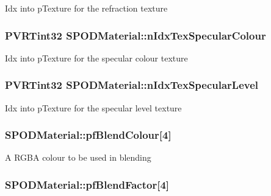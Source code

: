 Idx into p\+Texture for the refraction texture \hypertarget{struct_s_p_o_d_material_acc051ad745e461cbf67d5191cf4500c8}{
\subsubsection[{n\+Idx\+Tex\+Specular\+Colour}]{\setlength{\rightskip}{0pt plus 5cm}P\+V\+R\+Tint32 S\+P\+O\+D\+Material\+::n\+Idx\+Tex\+Specular\+Colour}}\label{struct_s_p_o_d_material_acc051ad745e461cbf67d5191cf4500c8}
Idx into p\+Texture for the specular colour texture \hypertarget{struct_s_p_o_d_material_a9cb44daa0051d93176e6fa77ce643bf9}{
\subsubsection[{n\+Idx\+Tex\+Specular\+Level}]{\setlength{\rightskip}{0pt plus 5cm}P\+V\+R\+Tint32 S\+P\+O\+D\+Material\+::n\+Idx\+Tex\+Specular\+Level}}\label{struct_s_p_o_d_material_a9cb44daa0051d93176e6fa77ce643bf9}
Idx into p\+Texture for the specular level texture \hypertarget{struct_s_p_o_d_material_aed6d778191f6103469789c67ff0e6312}{
\subsubsection[{pf\+Blend\+Colour}]{ S\+P\+O\+D\+Material\+::pf\+Blend\+Colour\mbox{[}4\mbox{]}}}\label{struct_s_p_o_d_material_aed6d778191f6103469789c67ff0e6312}
A R\+G\+B\+A colour to be used in blending \hypertarget{struct_s_p_o_d_material_ac33e201ec53bf91c52d50d8104804983}{
\subsubsection[{pf\+Blend\+Factor}]{ S\+P\+O\+D\+Material\+::pf\+Blend\+Factor\mbox{[}4\mbox{]}}}\label{struct_s_p_o_d_material_ac33e201ec53bf91c52d50d8104804983}
